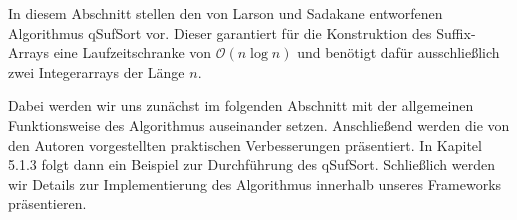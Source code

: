 \newtheorem{lemma}{Lemma}
In diesem Abschnitt stellen den von Larson und Sadakane entworfenen Algorithmus qSufSort\cite{saca:1} vor. 
Dieser garantiert für die Konstruktion des Suffix-Arrays eine Laufzeitschranke von $\mathcal{O}(n\log n)$ und benötigt dafür ausschließlich zwei Integerarrays der Länge $n$.


Dabei werden wir uns zunächst im folgenden Abschnitt mit der allgemeinen Funktionsweise des Algorithmus auseinander setzen. Anschließend werden die von den Autoren vorgestellten praktischen Verbesserungen präsentiert. In Kapitel 5.1.3 folgt dann ein Beispiel zur Durchführung des qSufSort. Schließlich werden wir Details zur Implementierung des Algorithmus innerhalb unseres Frameworks präsentieren.
